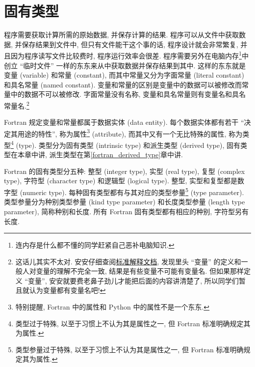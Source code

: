 \chapter{固有类型}\label{fortran_intrinsic_type}

程序需要获取计算所需的原始数据, 并保存计算的结果. 程序可以从文件中获取数据, 并保存结果到文件中, 但只有文件能干这个事的话, 程序设计就会非常繁复, 并且因为程序读写文件比较费时, 程序运行效率会很差. 程序需要另外在电脑内存\footnote{连内存是什么都不懂的同学赶紧自己恶补电脑知识.}中创立 ``临时文件'' 一样的东东来从中获取数据并保存结果到其中. 这样的东东就是变量 (variable) 和常量 (constant), 而其中常量又分为字面常量 (literal constant) 和具名常量 (named constant). 变量和常量的区别是变量中的数据可以被修改而常量中的数据不可以被修改. 字面常量没有名称, 变量和具名常量则有变量名和具名常量名.\footnote{这话儿其实不太对. 安安仔细查阅\href{https://j3-fortran.org/doc/year/24/24-007.pdf}{标准解释文档}, 发现里头 ``变量'' 的定义和一般人对变量的理解不完全一致, 结果是有些变量不可能有变量名. 但如果那样定义 ``变量'', 安安就要费老鼻子劲儿才能把后面的内容讲清楚了, 所以同学们暂且就认为变量都有变量名吧!}

Fortran 规定变量和常量都属于数据实体 (data entity). 每个数据实体都有若干 ``决定其用途的特性'', 称为属性\footnote{特别提醒, Fortran 中的属性和 Python 中的属性不是一个东东.} (attribute), 而其中又有一个无比特殊的属性, 称为类型\footnote{类型过于特殊, 以至于习惯上不认为其是属性之一, 但 Fortran 标准明确规定其为属性.} (type). 类型分为固有类型 (intrinsic type) 和派生类型 (derived type), 固有类型在本章中讲, 派生类型在第\ref{fortran_derived_type}章中讲.

Fortran 的固有类型分五种: 整型 (integer type), 实型 (real type), 复型 (complex type), 字符型 (character type) 和逻辑型 (logical type). 整型, 实型和复型都是数字型 (numeric type). 每种固有类型都有与其对应的类型参量\footnote{类型参量过于特殊, 以至于习惯上不认为其是属性之一, 但 Fortran 标准明确规定其为属性.} (type parameter). 类型参量分为种别类型参量 (kind type parameter) 和长度类型参量 (length type parameter), 简称种别和长度. 所有 Fortran 固有类型都有相应的种别, 字符型另有长度.

